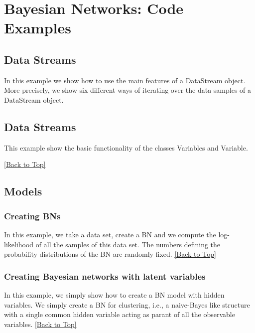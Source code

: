 \documentclass[10pt,a4paper]{article}
\begin{document}
\section{Bayesian Networks: Code Examples}\label{sec:bns}




\subsection{Data Streams}\label{sec:bns:datastreams}

In this example we show how to use the main features of a DataStream object. More precisely, we show six different ways of iterating over the data samples of a DataStream object.



\subsection{Data Streams}\label{sec:bns:randomvars}

This example show the basic functionality of the classes Variables and Variable.



\hyperref[sec:bns]{[Back to Top]}\newline 


\subsection{Models}\label{sec:bns:models}

\subsubsection{Creating BNs}\label{sec:bns:models:creating}
In this example, we take a data set, create a BN and we compute the log-likelihood of all the samples of this data set. The numbers defining the probability distributions of the BN are randomly fixed.
\hyperref[sec:bns]{[Back to Top]}\newline 

\subsubsection{Creating Bayesian networks with latent variables}\label{sec:bns:models:creatinglatent}
In this example, we simply show how to create a BN model with hidden variables. We simply create a BN for clustering, i.e., a naive-Bayes like structure with a single common hidden variable acting as parant of all the observable variables.
\hyperref[sec:bns]{[Back to Top]}\newline 
\end{document}
